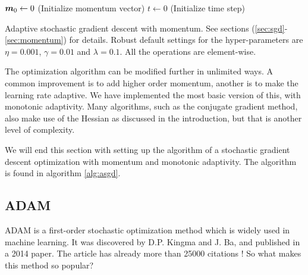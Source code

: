 \IncMargin{1em}
\begin{algorithm}
	\SetAlgoLined
	
	$\boldsymbol{{m}}_0\leftarrow 0$ (Initialize momentum vector)\;
	$t\leftarrow 0$ (Initialize time step)\;
	\caption{Adaptive stochastic gradient descent with momentum. See sections (\ref{sec:sgd}-\ref{sec:momentum}) for details. Robust default settings for the hyper-parameters are $\eta=0.001$, $\gamma=0.01$ and $\lambda=0.1$. All the operations are element-wise.}
	\label{alg:asgd}
\end{algorithm}\DecMargin{1em}

The optimization algorithm can be modified further in unlimited ways. A common improvement is to add higher order momentum, another is to make the learning rate adaptive. We have implemented the most basic version of this, with monotonic adaptivity. Many algorithms, such as the conjugate gradient method, also make use of the Hessian as discussed in the introduction, but that is another level of complexity. 

We will end this section with setting up the algorithm of a stochastic gradient descent optimization with momentum and monotonic adaptivity. The algorithm is found in algorithm \eqref{alg:asgd}.

\subsection{ADAM} \label{sec:adam}
ADAM is a first-order stochastic optimization method which is widely used in machine learning. It was discovered by D.P. Kingma and J. Ba, and published in a 2014 paper. The article has already more than 25000 citations \cite{kingma_adam:_2014}! So what makes this method so popular? 

